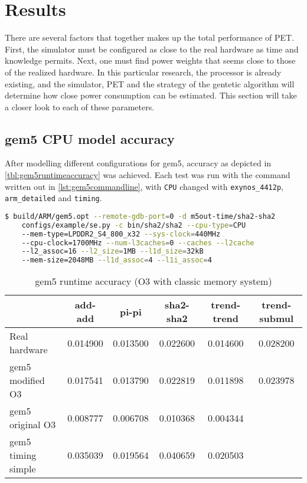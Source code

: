 \section{Results}



There are several factors that together makes up the total performance of PET. First, the simulator must be
configured as close to the real hardware as time and knowledge permits. Next, one must find power weights that
seems close to those of the realized hardware. In this particular research, the processor is already existing,
and the simulator, PET and the strategy of the gentetic algorithm will determine how close power consumption
can be estimated. This section will take a closer look to each of these parameters.

\subsection{gem5 CPU model accuracy}

After modelling different configurations for gem5, accuracy as depicted in \autoref{tbl:gem5runtimeaccuracy}
was achieved. Each test was run with the command written out in \autoref{lst:gem5commandline}, with \texttt{CPU}
changed with  \texttt{exynos\_4412p}, \texttt{arm\_detailed} and \texttt{timing}.

\begin{lstlisting}[language=sh,numbers=none,label={lst:gem5commandline},caption={gem5 Command Line}]
$ build/ARM/gem5.opt --remote-gdb-port=0 -d m5out-time/sha2-sha2
    configs/example/se.py -c bin/sha2/sha2 --cpu-type=CPU
    --mem-type=LPDDR2_S4_800_x32 --sys-clock=440MHz
    --cpu-clock=1700MHz --num-l3caches=0 --caches --l2cache
    --l2_assoc=16 --l2_size=1MB --l1d_size=32kB
    --mem-size=2048MB --l1d_assoc=4 --l1i_assoc=4
\end{lstlisting}


\begin{table}
\centering
\begin{tabular}{|l|c|c|c|c|c|}
\hline
   & add-add & pi-pi & sha2-sha2 & trend-trend & trend-submul\\
\hline
Real hardware & 0.014900  & 0.013500 & 0.022600 & 0.014600 & 0.028200\\
gem5 modified O3    & 0.017541 & 0.013790 & 0.022819 & 0.011898 & 0.023978 \\
gem5 original O3    & 0.008777 & 0.006708 & 0.010368 & 0.004344 & \\
gem5 timing simple  & 0.035039 & 0.019564 & 0.040659 & 0.020503 & \\
\hline
\end{tabular}
\caption{gem5 runtime accuracy (O3 with classic memory system)}
\label{tbl:gem5runtimeaccuracy}
\end{table}





